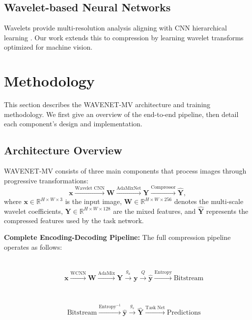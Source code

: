 \documentclass[conference]{IEEEtran}
\begin{document}
\subsection{Wavelet-based Neural Networks}

Wavelets provide multi-resolution analysis aligning with CNN hierarchical learning \cite{liu2018multi, huang2017wavelet}. Our work extends this to compression by learning wavelet transforms optimized for machine vision.

\section{Methodology}

This section describes the WAVENET-MV architecture and training methodology. We first give an overview of the end-to-end pipeline, then detail each component's design and implementation.

\subsection{Architecture Overview}

WAVENET-MV consists of three main components that process images through progressive transformations:
\begin{equation}
\mathbf{x} \xrightarrow{\text{Wavelet CNN}} \mathbf{W} \xrightarrow{\text{AdaMixNet}} \mathbf{Y} \xrightarrow{\text{Compressor}} \hat{\mathbf{Y}},
\end{equation}
where $\mathbf{x} \in \mathbb{R}^{H \times W \times 3}$ is the input image, $\mathbf{W} \in \mathbb{R}^{H \times W \times 256}$ denotes the multi-scale wavelet coefficients, $\mathbf{Y} \in \mathbb{R}^{H \times W \times 128}$ are the mixed features, and $\hat{\mathbf{Y}}$ represents the compressed features used by the task network.

\textbf{Complete Encoding-Decoding Pipeline:} The full compression pipeline operates as follows:

 \\
\begin{align}
\quad &\mathbf{x} \xrightarrow{\text{WCNN}} \mathbf{W} \xrightarrow{\text{AdaMix}} \mathbf{Y} \xrightarrow{g_a} \mathbf{y} \xrightarrow{Q} \hat{\mathbf{y}} \xrightarrow{\text{Entropy}} \text{Bitstream} 
\end{align}
\\
 \\
\begin{align}
\quad &\text{Bitstream} \xrightarrow{\text{Entropy}^{-1}} \hat{\mathbf{y}} \xrightarrow{g_s} \hat{\mathbf{Y}} \xrightarrow{\text{Task Net}} \text{Predictions}
\end{align}
\end{document}
